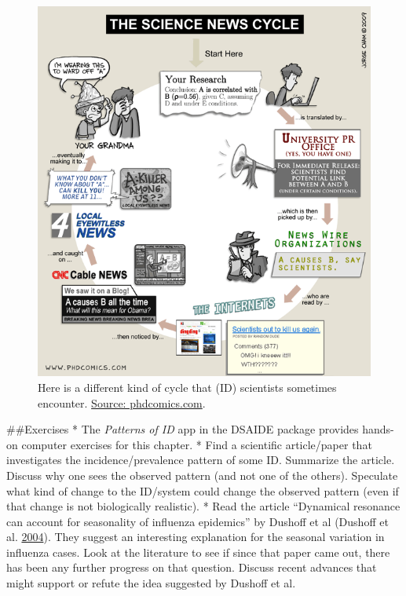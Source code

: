 \documentclass[]{book}
\theoremstyle{definition}
\theoremstyle{definition}
\theoremstyle{definition}
\theoremstyle{remark}
\begin{document}
\begin{figure}
\centering
\includegraphics{./images/phd_sciencenewscycle.png}
\caption{\label{fig:sciencenewscycle}Here is a different kind of cycle that
(ID) scientists sometimes encounter.
\href{http://www.phdcomics.com/comics/archive.php?comicid=1174}{Source:
phdcomics.com}.}
\end{figure}

\#\#Exercises * The \emph{Patterns of ID} app in the DSAIDE package
provides hands-on computer exercises for this chapter. * Find a
scientific article/paper that investigates the incidence/prevalence
pattern of some ID. Summarize the article. Discuss why one sees the
observed pattern (and not one of the others). Speculate what kind of
change to the ID/system could change the observed pattern (even if that
change is not biologically realistic). * Read the article ``Dynamical
resonance can account for seasonality of influenza epidemics'' by
Dushoff et al (Dushoff et al. \protect\hyperlink{ref-dushoff04}{2004}).
They suggest an interesting explanation for the seasonal variation in
influenza cases. Look at the literature to see if since that paper came
out, there has been any further progress on that question. Discuss
recent advances that might support or refute the idea suggested by
Dushoff et al.
\end{document}
